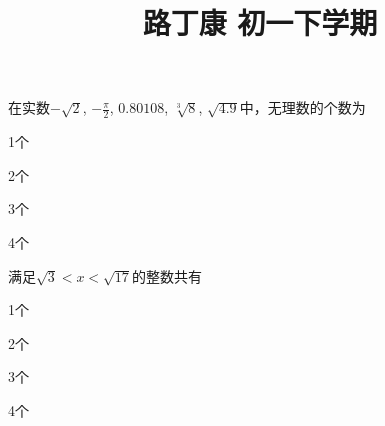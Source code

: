 \documentclass{exam-zh}
\title{路丁康 初一下学期}\subject{错题汇总}
\begin{document}
\maketitle\begin{question}在实数$-\sqrt{2}$, $-\frac{\pi}{2}$, $0.80108$, $\sqrt[3]{8}$, $\sqrt{4.9}$中，无理数的个数为\paren\begin{choices}\item 1个\item 2个\item 3个\item 4个\end{choices}\end{question}\begin{question}满足$\sqrt{3}<x<\sqrt{17}$的整数共有\paren\begin{choices}\item 1个\item 2个\item 3个\item 4个\end{choices}\end{question}
\end{document}
